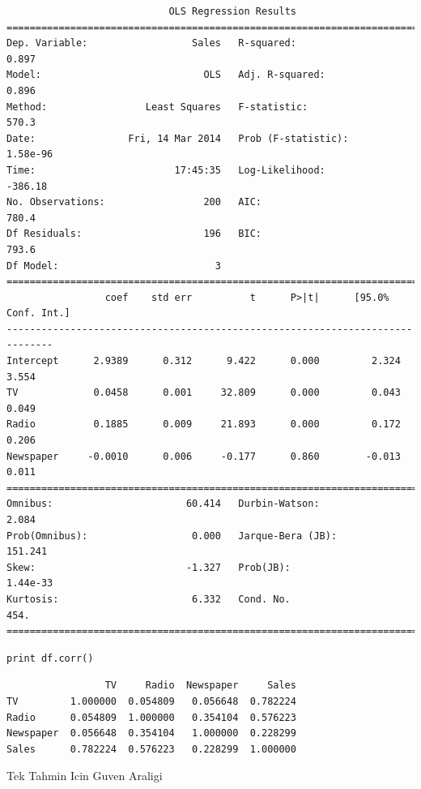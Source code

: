 \documentclass[12pt,fleqn]{article}\usepackage{../common}
\begin{document}
\begin{verbatim}
                            OLS Regression Results                            
==============================================================================
Dep. Variable:                  Sales   R-squared:                       0.897
Model:                            OLS   Adj. R-squared:                  0.896
Method:                 Least Squares   F-statistic:                     570.3
Date:                Fri, 14 Mar 2014   Prob (F-statistic):           1.58e-96
Time:                        17:45:35   Log-Likelihood:                -386.18
No. Observations:                 200   AIC:                             780.4
Df Residuals:                     196   BIC:                             793.6
Df Model:                           3                                         
==============================================================================
                 coef    std err          t      P>|t|      [95.0% Conf. Int.]
------------------------------------------------------------------------------
Intercept      2.9389      0.312      9.422      0.000         2.324     3.554
TV             0.0458      0.001     32.809      0.000         0.043     0.049
Radio          0.1885      0.009     21.893      0.000         0.172     0.206
Newspaper     -0.0010      0.006     -0.177      0.860        -0.013     0.011
==============================================================================
Omnibus:                       60.414   Durbin-Watson:                   2.084
Prob(Omnibus):                  0.000   Jarque-Bera (JB):              151.241
Skew:                          -1.327   Prob(JB):                     1.44e-33
Kurtosis:                       6.332   Cond. No.                         454.
==============================================================================
\end{verbatim}


\begin{verbatim}
print df.corr()
\end{verbatim}

\begin{verbatim}
                 TV     Radio  Newspaper     Sales
TV         1.000000  0.054809   0.056648  0.782224
Radio      0.054809  1.000000   0.354104  0.576223
Newspaper  0.056648  0.354104   1.000000  0.228299
Sales      0.782224  0.576223   0.228299  1.000000
\end{verbatim}

Tek Tahmin Icin Guven Araligi
\end{document}
